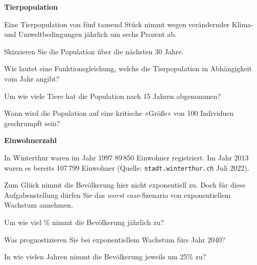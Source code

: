 

\bbwActAufgabenNr{} \textbf{Tierpopulation}

Eine Tierpopulation von fünf tausend Stück nimmt wegen verändernder Klima-
und Umweltbedingungen jährlich um sechs Prozent ab.


\begin{bbwAufgabenBlock}

\item Skizzieren Sie die Population über die nächsten 30 Jahre.
\item Wie lautet eine Funktionsgleichung, welche die Tierpopulation in
  Abhängigkeit vom Jahr angibt?
\item Um wie viele Tiere hat die Population nach 15 Jahren abgenommen?


  

\item Wann wird die Population auf eine kritische «Größe» von 100
  Individuen geschrumpft sein?
\end{bbwAufgabenBlock}
\platzFuerBerechnungenBisEndeSeite{}


\bbwActAufgabenNr{} \textbf{Einwohnerzahl}

In Winterthur waren im Jahr 1997 89\,850 Einwohner registriert. Im Jahr 2013 waren es
bereits 107\,799 Einwohner (Quelle: \texttt{stadt.winterthur.ch} Juli 2022).

Zum Glück nimmt die Bevölkerung hier nicht exponentiell zu. Doch für
diese Aufgabenstellung dürfen Sie das \textit{worst case}-Szenario von
exponentiellem Wachstum annehmen.

\begin{bbwAufgabenBlock}
\item Um wie viel \% nimmt die Bevölkerung jährlich zu?
\item Was prognostizieren Sie bei exponentiellem Wachstum fürs Jahr 2040?
\item In wie vielen Jahren nimmt die Bevölkerung jeweils um 25\% zu?
\end{bbwAufgabenBlock}
\platzFuerBerechnungenBisEndeSeite{}

